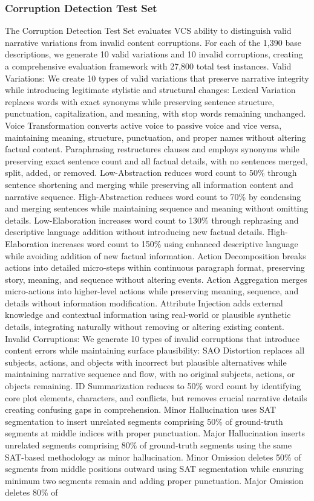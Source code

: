 \documentclass[main.tex]{subfiles}
\begin{document}
\subsubsection{Corruption Detection Test Set}
The Corruption Detection Test Set evaluates VCS ability to distinguish valid narrative variations from invalid content corruptions. For each of the 1,390 base descriptions, we generate 10 valid variations and 10 invalid corruptions, creating a comprehensive evaluation framework with 27,800 total test instances. Valid Variations: We create 10 types of valid variations that preserve narrative integrity while introducing legitimate stylistic and structural changes: Lexical Variation replaces words with exact synonyms while preserving sentence structure, punctuation, capitalization, and meaning, with stop words remaining unchanged. Voice Transformation converts active voice to passive voice and vice versa, maintaining meaning, structure, punctuation, and proper names without altering factual content. Paraphrasing restructures clauses and employs synonyms while preserving exact sentence count and all factual details, with no sentences merged, split, added, or removed. Low-Abstraction reduces word count to 50\% through sentence shortening and merging while preserving all information content and narrative sequence. High-Abstraction reduces word count to 70\% by condensing and merging sentences while maintaining sequence and meaning without omitting details. Low-Elaboration increases word count to 130\% through rephrasing and descriptive language addition without introducing new factual details. High-Elaboration increases word count to 150\% using enhanced descriptive language while avoiding addition of new factual information. Action Decomposition breaks actions into detailed micro-steps within continuous paragraph format, preserving story, meaning, and sequence without altering events. Action Aggregation merges micro-actions into higher-level actions while preserving meaning, sequence, and details without information modification. Attribute Injection adds external knowledge and contextual information using real-world or plausible synthetic details, integrating naturally without removing or altering existing content. Invalid Corruptions: We generate 10 types of invalid corruptions that introduce content errors while maintaining surface plausibility: SAO Distortion replaces all subjects, actions, and objects with incorrect but plausible alternatives while maintaining narrative sequence and flow, with no original subjects, actions, or objects remaining. ID Summarization reduces to 50\% word count by identifying core plot elements, characters, and conflicts, but removes crucial narrative details creating confusing gaps in comprehension. Minor Hallucination uses SAT segmentation to insert unrelated segments comprising 50\% of ground-truth segments at middle indices with proper punctuation. Major Hallucination inserts unrelated segments comprising 80\% of ground-truth segments using the same SAT-based methodology as minor hallucination. Minor Omission deletes 50\% of segments from middle positions outward using SAT segmentation while ensuring minimum two segments remain and adding proper punctuation. Major Omission deletes 80\% of 
\end{document}
